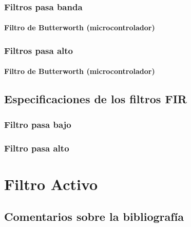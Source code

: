 \documentclass[oneside,a4paper,10pt]{scrbook}
\begin{document}
{{ 			\clearpage	
			
			\subsection{Filtros pasa banda}
			{
				\subsubsection{Filtro de Butterworth  (microcontrolador)}
				{
					
				}
			}
	
			\clearpage				
			
			\subsection{Filtros pasa alto}
			{
				\subsubsection{Filtro de Butterworth  (microcontrolador)}
				{
								
				}
			}					
		}
		
		\clearpage			
		
		\section{Especificaciones de los filtros FIR}
		{
			\subsection{Filtro pasa bajo}
			{
				
			}
			
			\clearpage			

			\subsection{Filtro pasa alto}
			{
				
			}
		}
	}
	
	\clearpage			
	
	\chapter{Filtro Activo}
	{
		
		\section{Comentarios sobre la bibliografía}
		{
			
		}
		
		\clearpage			
	}	
\end{document}
